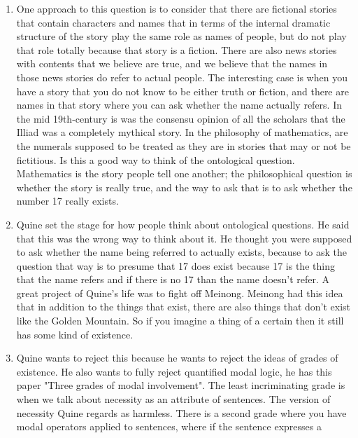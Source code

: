 \documentclass[12pt]{article}
\theoremstyle{definition}
\begin{document}
\begin{enumerate}
    \item
        One approach to this question is to consider that there are fictional
        stories that contain characters and names that in terms of the internal
        dramatic structure of the story play the same role as names of people,
        but do not play that role totally because that story is a fiction.
        There are also news stories with contents that we believe are true, and
        we believe that the names in those news stories do refer to actual
        people. The interesting case is when you have a story that you do not
        know to be either truth or fiction, and there are names in that story
        where you can ask whether the name actually refers. In the mid
        19th-century is was the consensu opinion of all the scholars that the
        Illiad was a completely mythical story. In the philosophy of
        mathematics, are the numerals supposed to be treated as they are in
        stories that may or not be fictitious. Is this a good way to think of
        the ontological question. Mathematics is the story people tell one
        another; the philosophical question is whether the story is really
        true, and the way to ask that is to ask whether the number 17 really
        exists. 
    \item
        Quine set the stage for how people think about ontological questions.
        He said that this was the wrong way to think about it. He thought you
        were supposed to ask whether the name being referred to actually
        exists, because to ask the question that way is to presume that 17 does
        exist because 17 is the thing that the name refers and if there is no
        17 than the name doesn't refer. A great project of Quine's life was to
        fight off Meinong. Meinong had this idea that in addition to the things
        that exist, there are also things that don't exist like the Golden
        Mountain. So if you imagine a thing of a certain then it still has some
        kind of existence. 
    \item
        Quine wants to reject this because he wants to
        reject the ideas of grades of existence. He also wants to fully reject
        quantified modal logic, he has this paper "Three grades of modal
        involvement". The least incriminating grade is when we talk about
        necessity as an attribute of sentences. The version of necessity Quine
        regards as harmless. There is a second grade where you have modal
        operators applied to sentences, where if the sentence expresses a

\end{enumerate}
\end{document}
